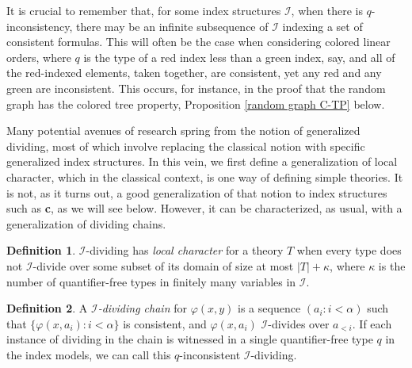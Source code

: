 \documentclass{article}
\newcommand{\calI}{\mathcal{I}}
\newcommand{\vphi}{\varphi}
\theoremstyle{definition}
\newtheorem{definition}{Definition}
\theoremstyle{definition}
\theoremstyle{definition}
\theoremstyle{definition}
\begin{document}
It is crucial to remember that, for some index structures $\calI$, when there is $q$-inconsistency, there may be an infinite subsequence of $\calI$ indexing a set of consistent formulas. This will often be the case when considering colored linear orders, where $q$ is the type of a red index less than a green index, say, and all of the red-indexed elements, taken together, are consistent, yet any red and any green are inconsistent. This occurs, for instance, in the proof that the random graph has the colored tree property, Proposition \ref{random graph C-TP} below.

Many potential avenues of research spring from the notion of generalized dividing, most of which involve replacing the classical notion with specific generalized index structures. In this vein, we first define a generalization of local character, which in the classical context, is one way of defining simple theories. It is not, as it turns out, a good generalization of that notion to index structures such as \textbf{c}, as we will see below. However, it can be characterized, as usual, with a generalization of dividing chains.

\begin{definition}{}
$\calI$-dividing has \textit{local character} for a theory $T$ when every type does not $\calI$-divide over some subset of its domain of size at most $|T|+\kappa$, where $\kappa$ is the number of quantifier-free types in finitely many variables in $\calI$. 
\end{definition}

\begin{definition}{}
A $\calI$\textit{-dividing chain} for $\vphi(x,y)$ is a sequence $(a_i\colon i<\alpha)$ such that $\{\vphi(x, a_i)\colon i<\alpha\}$ is consistent, and $\vphi(x,a_i)$ $\calI$-divides over $a_{<i}$. If each instance of dividing in the chain is witnessed in a single quantifier-free type $q$ in the index models, we can call this $q$-inconsistent $\calI$-dividing.
\end{definition}
\end{document}
